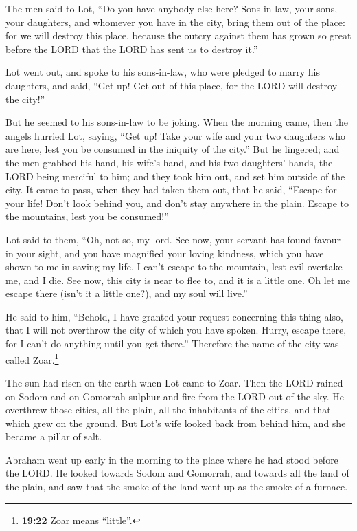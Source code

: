  The men said to Lot, ``Do you have anybody else here?
Sons-in-law, your sons, your daughters, and whomever you have in the
city, bring them out of the place:  for we will destroy
this place, because the outcry against them has grown so great before
the LORD that the LORD has sent us to destroy it.''

 Lot went out, and spoke to his sons-in-law, who were
pledged to marry his daughters, and said, ``Get up! Get out of this
place, for the LORD will destroy the city!''

But he seemed to his sons-in-law to be joking.  When the
morning came, then the angels hurried Lot, saying, ``Get up! Take your
wife and your two daughters who are here, lest you be consumed in the
iniquity of the city.''  But he lingered; and the men
grabbed his hand, his wife's hand, and his two daughters' hands, the
LORD being merciful to him; and they took him out, and set him outside
of the city.  It came to pass, when they had taken them
out, that he said, ``Escape for your life! Don't look behind you, and
don't stay anywhere in the plain. Escape to the mountains, lest you be
consumed!''

 Lot said to them, ``Oh, not so, my lord. 
See now, your servant has found favour in your sight, and you have
magnified your loving kindness, which you have shown to me in saving my
life. I can't escape to the mountain, lest evil overtake me, and I die.
 See now, this city is near to flee to, and it is a
little one. Oh let me escape there (isn't it a little one?), and my soul
will live.''

 He said to him, ``Behold, I have granted your request
concerning this thing also, that I will not overthrow the city of which
you have spoken.  Hurry, escape there, for I can't do
anything until you get there.'' Therefore the name of the city was
called Zoar.\footnote{\textbf{19:22} Zoar means ``little''.}

 The sun had risen on the earth when Lot came to Zoar.
 Then the LORD rained on Sodom and on Gomorrah sulphur
and fire from the LORD out of the sky.  He overthrew
those cities, all the plain, all the inhabitants of the cities, and that
which grew on the ground.  But Lot's wife looked back
from behind him, and she became a pillar of salt.

 Abraham went up early in the morning to the place where
he had stood before the LORD.  He looked towards Sodom
and Gomorrah, and towards all the land of the plain, and saw that the
smoke of the land went up as the smoke of a furnace.

